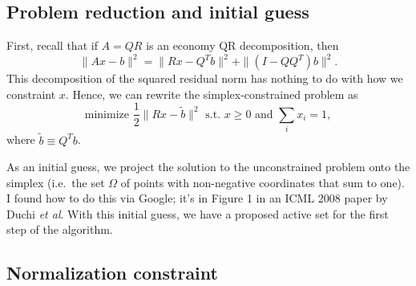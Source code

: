 \documentclass[12pt, leqno]{article} %
\begin{document}
\subsection*{Problem reduction and initial guess}

First, recall that if $A = QR$ is an economy QR decomposition, then
\[
  \|Ax-b\|^2 = \|Rx-Q^T b\|^2 + \|(I-QQ^T)b\|^2.
\]
This decomposition of the squared residual norm has nothing to do with
how we constraint $x$.  Hence, we can rewrite the simplex-constrained
problem as
\[
  \mbox{minimize } \frac{1}{2} \|Rx-\tilde{b}\|^2 \mbox{ s.t. } x \geq 0
  \mbox{ and } \sum_i x_i = 1,
\]
where $\tilde{b} \equiv Q^T b$.

As an initial guess, we project the solution to the unconstrained
problem onto the simplex (i.e.~the set $\Omega$ of points with
non-negative coordinates that sum to one).  I found how to do this via
Google; it's in Figure 1 in an ICML 2008 paper by Duchi {\em et al}.
With this initial guess, we have a proposed active set for
the first step of the algorithm.

\subsection*{Normalization constraint}
\end{document}
